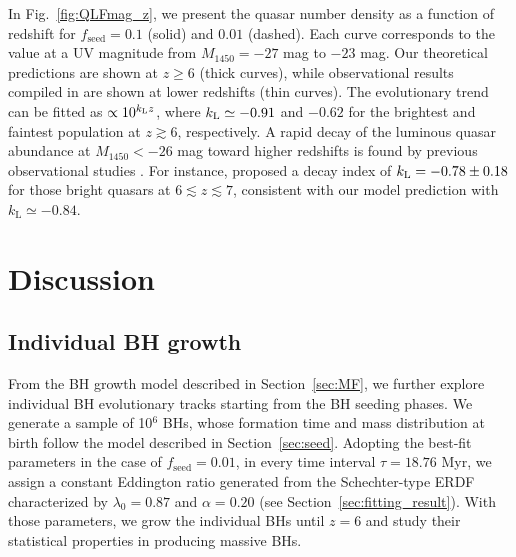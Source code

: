 \documentclass[twocolumn, twocolappendix]{aastex63}
\newcommand{\tlife}{\tau}
\newcommand{\fseed}{f_\mathrm{seed}}
\newcommand{\Muv}{M_{1450}}
\begin{document}
\begin{CJK*}{UTF8}{gbsn}
In Fig.~\ref{fig:QLFmag_z}, we present the quasar number density as a function of redshift for 
$\fseed =0.1$ (solid) and $0.01$ (dashed).
Each curve corresponds to the value at a UV magnitude from $\Muv=-27$ mag to $-23$ mag.
Our theoretical predictions are shown at $z\geq 6$ (thick curves),
while observational results compiled in \cite{2020ApJ...904...89N} are shown at lower redshifts (thin curves).
The evolutionary trend can be fitted as $\propto 10^{k_{\rm L}z}$,
where $k_{\rm L}\simeq -0.91$ and $-0.62$ for the brightest and faintest population
at $z\gtrsim 6$, respectively.
A rapid decay of the luminous quasar abundance at $\Muv<-26$ mag toward higher redshifts is found by 
previous observational studies \citep[e.g.,][]{2001AJ....122.2833F,2013ApJ...768..105M,2016ApJ...833..222J,2019ApJ...884...30W}.
For instance, \citet{2019ApJ...884...30W} proposed a decay index of $k_{\rm L}=-0.78\pm{0.18}$ for those bright quasars at $6\lesssim z \lesssim 7$,
consistent with our model prediction with $k_\mathrm{L} \simeq -0.84$.


\vspace{2mm}
\section{Discussion}\label{sec:discussion}
\vspace{2mm}
\subsection{Individual BH growth}\label{sec:evol}

From the BH growth model described in Section~\ref{sec:MF}, we further explore individual BH evolutionary tracks starting from the BH seeding phases.
We generate a sample of 10$^6$ BHs, whose formation time and mass distribution at birth follow the model described in Section~\ref{sec:seed}. 
Adopting the best-fit parameters in the case of $\fseed = 0.01$, in every time interval $\tlife=18.76$ Myr,
we assign a constant Eddington ratio generated from the Schechter-type ERDF characterized by $\lambda_0=0.87$ and $\alpha=0.20$ 
(see Section~\ref{sec:fitting_result}).
With those parameters, we grow the individual BHs until $z=6$ and study their statistical properties in producing massive BHs.



\end{CJK*}
\end{document}
